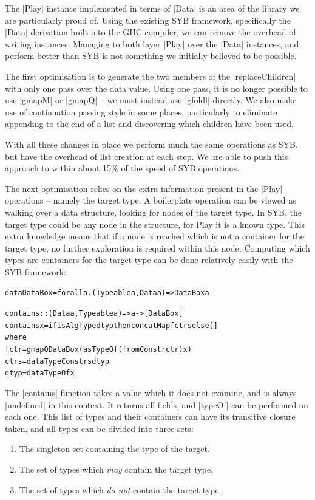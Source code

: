 \documentclass[preprint]{sigplanconf}
\newenvironment{code}{\begin{alltt}\small}{\end{alltt}}
\begin{document}
The |Play| instance implemented in terms of |Data| is an area of the library we are particularly proud of. Using the existing SYB framework, specifically the |Data| derivation built into the GHC compiler, we can remove the overhead of writing instances. Managing to both layer |Play| over the |Data| instances, and perform better than SYB is not something we initially believed to be possible.

The first optimisation is to generate the two members of the |replaceChildren| with only one pass over the data value. Using one pass, it is no longer possible to use |gmapM| or |gmapQ| -- we must instead use |gfoldl| directly. We also make use of continuation passing style in some places, particularly to eliminate appending to the end of a list and discovering which children have been used.

With all these changes in place we perform much the same operations as SYB, but have the overhead of list creation at each step. We are able to push this approach to within about 15\% of the speed of SYB operations.

The next optimisation relies on the extra information present in the |Play| operations -- namely the target type. A boilerplate operation can be viewed as walking over a data structure, looking for nodes of the target type. In SYB, the target type could be any node in the structure, for Play it is a known type. This extra knowledge means that if a node is reached which is not a container for the target type, no further exploration is required within this node. Computing which types are containers for the target type can be done relatively easily with the SYB framework:

\begin{code}
data DataBox = forall a . (Typeable a, Data a) => DataBox a

contains :: (Data a, Typeable a) => a -> [DataBox]
contains x = if isAlgType dtyp then concatMap f ctrs else []
    where
        f ctr = gmapQ DataBox (asTypeOf (fromConstr ctr) x)
        ctrs = dataTypeConstrs dtyp
        dtyp = dataTypeOf x
\end{code}

The |contains| function takes a value which it does not examine, and is always |undefined| in this context. It returns all fields, and |typeOf| can be performed on each one. This list of types and their containers can have its transitive closure taken, and all types can be divided into three sets:

\begin{enumerate}
\item The singleton set containing the type of the target.
\item The set of types which \textit{may} contain the target type.
\item The set of types which \textit{do not} contain the target type.
\end{enumerate}
\end{document}
